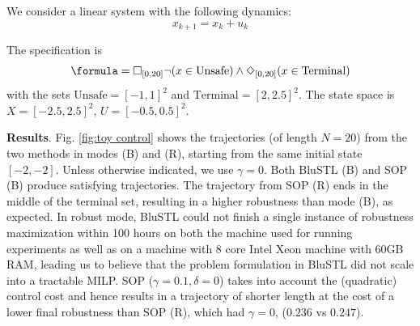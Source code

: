 \begin{exmp}
\label{ex:toyproblem}
We consider a linear system with the following dynamics:
\begin{equation}
\label{eq:PointMass}
x_{k+1} = x_k + u_k
\end{equation}

The specification is 
\[\formula = \always_{[0,20]} \neg (x \in \text{Unsafe}) \land \eventually_{[0,20]} (x \in \text{Terminal})\]
with the sets $\text{Unsafe}=[-1,1]^2$ and $\text{Terminal}=[2,2.5]^2$. 
The state space is $X=[-2.5,2.5]^2$, $U=[-0.5,0.5]^2$.






\textbf{Results}.
Fig. \ref{fig:toy control} shows the trajectories (of length $N=20$) from the two methods in modes (B) and (R), starting from the same initial state $[-2,-2]$. Unless otherwise indicated, we use $\gamma=0$. Both BluSTL (B) and SOP (B) produce satisfying trajectories. The trajectory from SOP (R) ends in the middle of the terminal set, resulting in a higher robustness than mode (B), as expected. 
In robust mode, BluSTL could not finish a single instance of robustness maximization within 100 hours on both the machine used for running experiments as well as on a machine with 8 core Intel Xeon machine with 60GB RAM, leading us to believe that the problem formulation in BluSTL did not scale into a tractable MILP. 
SOP ($\gamma=0.1,\delta=0$) takes into account the (quadratic) control cost and hence results in a trajectory of shorter length at the cost of a lower final robustness than SOP (R), which had $\gamma = 0$, ($0.236$ vs $0.247$).


\end{exmp}
